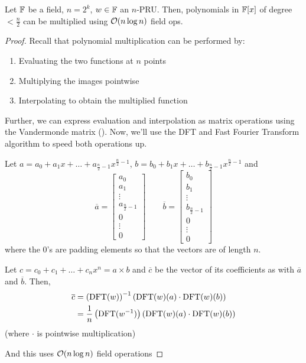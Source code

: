 \begin{theorem}{}{}
    Let $\operatorname{\mathbb{F}}$ be a field, $n = 2^k$, $w \in \operatorname{\mathbb{F}}$ an $n$-PRU.
    Then, polynomials in $\operatorname{\mathbb{F}}[x]$ of degree $< \frac{n}{2}$ can be multiplied using $\operatorname{\mathcal{O}}(n \log n)$ field ops.
\end{theorem}
\begin{proof}
    Recall that polynomial multiplication can be performed by:
    \begin{enumerate}
        \item Evaluating the two functions at $n$ points
        \item Multiplying the images pointwise
        \item Interpolating to obtain the multiplied function
    \end{enumerate}

    Further, we can express evaluation and interpolation as matrix operations using the Vandermonde matrix ().
    Now, we'll use the DFT and Fast Fourier Transform algorithm to speed both operations up.

    Let $a = a_0 + a_1x + \ldots + a_{\frac{n}{2} - 1}x^{\frac{n}{2} - 1}$, $b = b_0 + b_1x + \ldots + b_{\frac{n}{2} - 1}x^{\frac{n}{2} - 1}$ and
    \begin{equation*}
        \overline{a} = 
        \begin{bmatrix}
            a_0 \\ a_1 \\ \vdots \\ a_{\frac{n}{2} - 1} \\ 0 \\ \vdots \\ 0    
        \end{bmatrix}
        \qquad
        \overline{b} = 
        \begin{bmatrix}
            b_0 \\ b_1 \\ \vdots \\ b_{\frac{n}{2} - 1} \\ 0 \\ \vdots \\ 0    
        \end{bmatrix}
    \end{equation*}
    where the $0$'s are padding elements so that the vectors are of length $n$.

    Let $c = c_0 + c_1 + \ldots + c_nx^n = a \times b$ and $\overline{c}$ be the vector of its coefficients as with $\overline{a}$ and $\overline{b}$.
    Then,
    \begin{align*}
        \overline{c} &= \left(\operatorname{DFT}(w)\right)^{-1}\left(\operatorname{DFT}(w)(a) \cdot \operatorname{DFT}(w)(b)\right) \\
        &= \frac{1}{n}\left(\operatorname{DFT}(w^{-1})\right)\left(\operatorname{DFT}(w)(a) \cdot \operatorname{DFT}(w)(b)\right)
    \end{align*}
    (where $\cdot$ is pointwise multiplication)

    And this uses $\operatorname{\mathcal{O}}(n\log n)$ field operations
\end{proof}

